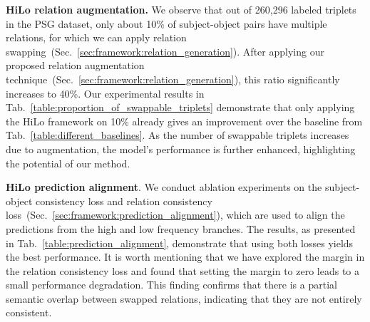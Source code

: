 \noindent \textbf{HiLo relation augmentation.}
We observe that out of 260,296 labeled triplets in the PSG dataset, only about 10\% of subject-object pairs have multiple relations, for which we can apply relation swapping~(Sec.~\ref{sec:framework:relation_generation}).
After applying our proposed relation augmentation technique~(Sec.~\ref{sec:framework:relation_generation}), this ratio significantly increases to 40\%.
Our experimental results in Tab.~\ref{table:proportion_of_swappable_triplets} demonstrate that only applying the HiLo framework on 10\% already gives an improvement over the baseline from Tab.~\ref{table:different_baselines}. As the number of swappable triplets increases due to augmentation, the model's performance is further enhanced, highlighting the potential of our method.


\begin{table}\small
    \centering
    \vspace{+1mm}
    \caption{Ablation study for HiLo relation augmentation. Relation augmentation affects the ratio of subject-object pairs with multiple relations. The larger this ratio, the more relations can be swapped, which leads to better results.
    }
    \vspace{-4mm}
    \label{table:proportion_of_swappable_triplets}
\end{table}



\noindent \textbf{HiLo prediction alignment}.
We conduct ablation experiments on the subject-object consistency loss and relation consistency loss~(Sec.~\ref{sec:framework:prediction_alignment}), which are used to align the predictions from the high and low frequency branches.
The results, as presented in Tab.~\ref{table:prediction_alignment}, demonstrate that using both losses yields the best performance.
It is worth mentioning that we have explored the margin in the relation consistency loss and found that setting the margin to zero leads to a small performance degradation.
This finding confirms that there is a partial semantic overlap between swapped relations, indicating that they are not entirely consistent.

